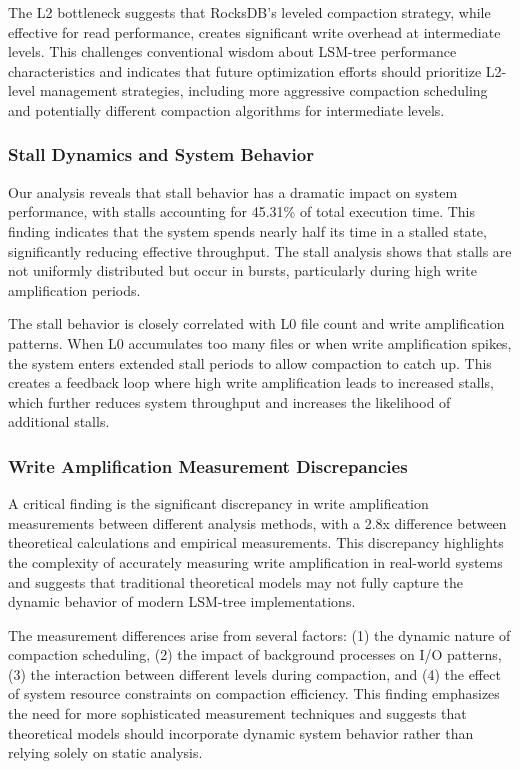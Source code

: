 \documentclass[11pt]{article}
\begin{document}
The L2 bottleneck suggests that RocksDB's leveled compaction strategy, while effective for read performance, creates significant write overhead at intermediate levels. This challenges conventional wisdom about LSM-tree performance characteristics and indicates that future optimization efforts should prioritize L2-level management strategies, including more aggressive compaction scheduling and potentially different compaction algorithms for intermediate levels.

\subsubsection{Stall Dynamics and System Behavior}

Our analysis reveals that stall behavior has a dramatic impact on system performance, with stalls accounting for 45.31\% of total execution time. This finding indicates that the system spends nearly half its time in a stalled state, significantly reducing effective throughput. The stall analysis shows that stalls are not uniformly distributed but occur in bursts, particularly during high write amplification periods.

The stall behavior is closely correlated with L0 file count and write amplification patterns. When L0 accumulates too many files or when write amplification spikes, the system enters extended stall periods to allow compaction to catch up. This creates a feedback loop where high write amplification leads to increased stalls, which further reduces system throughput and increases the likelihood of additional stalls.

\subsubsection{Write Amplification Measurement Discrepancies}

A critical finding is the significant discrepancy in write amplification measurements between different analysis methods, with a 2.8x difference between theoretical calculations and empirical measurements. This discrepancy highlights the complexity of accurately measuring write amplification in real-world systems and suggests that traditional theoretical models may not fully capture the dynamic behavior of modern LSM-tree implementations.

The measurement differences arise from several factors: (1) the dynamic nature of compaction scheduling, (2) the impact of background processes on I/O patterns, (3) the interaction between different levels during compaction, and (4) the effect of system resource constraints on compaction efficiency. This finding emphasizes the need for more sophisticated measurement techniques and suggests that theoretical models should incorporate dynamic system behavior rather than relying solely on static analysis.
\end{document}
